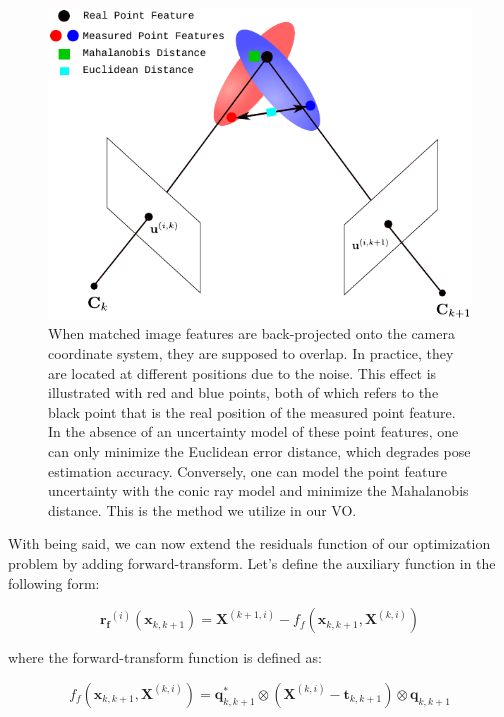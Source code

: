 \documentclass[a4paper]{report}
\numberwithin{figure}{section}
\begin{document}
\begin{figure}[H] \centering
\includegraphics[width=0.9\linewidth,natwidth=640,natheight=640]
{fig/drawings/feature_uncertainty.pdf} \caption[Pose Estimation With Feature
Uncertainty] {When matched image features are back-projected onto the camera
coordinate system, they are supposed to overlap. In practice, they are located
at different positions due to the noise. This effect is illustrated with red
and blue points, both of which refers to the black point that is the real
position of the measured point feature. In the absence of an uncertainty model
of these point features, one can only minimize the Euclidean error distance,
which degrades pose estimation accuracy. Conversely, one can model the point
feature uncertainty with the conic ray model and minimize the Mahalanobis
distance. This is the method we utilize in our VO.} \label{fig:min_mahalanobis}
\end{figure}

With being said, we can now extend the residuals function of our optimization
problem by adding forward-transform.  Let's define the auxiliary function in 
the
following form:

\begin{equation} \mathbf{r_{f}}^{(i)}(\mathbf{x}_{k,k+1}) =
\mathbf{X}^{(k+1,i)} - f_f(\mathbf{x}_{k,k+1}, \mathbf{X}^{(k,i)})
\end{equation}

where the forward-transform function is defined as:

\begin{equation} f_f(\mathbf{x}_{k,k+1}, \mathbf{X}^{(k,i)}) =
\mathbf{q}_{k,k+1}^* \otimes (\mathbf{X}^{(k,i)} - \mathbf{t}_{k,k+1})
\otimes \mathbf{q}_{k,k+1} \end{equation}
\end{document}

